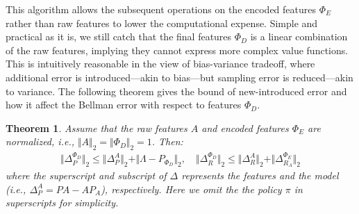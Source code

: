 \documentclass[onecolumn, conference]{IEEEtran}
\newtheorem{theorem}{\textbf{Theorem}}
\begin{document}
This algorithm allows the subsequent operations on the encoded features $\Phi_E$ rather than raw features to lower the computational expense. Simple and practical as it is, we still catch that the final features $\Phi_D$ is a linear combination of the raw features, implying they cannot express more complex value functions. This is intuitively reasonable in the view of bias-variance tradeoff, where additional error is introduced—akin to bias—but sampling error is reduced—akin to variance. The following theorem gives the bound of new-introduced error and how it affect the Bellman error with respect to features $\Phi_D$.
\begin{theorem}\label{theorem:nontabular}
	Assume that the raw features $A$ and encoded features $\Phi_E$ are normalized, \textit{i.e.,} $\Vert A\Vert_2 = \Vert \Phi_D\Vert_2 = 1$. Then:
		\begin{align*}
			\Vert \Delta_{P}^{\Phi_D}\Vert_2 \le \Vert \Delta_P^A\Vert_2 + \Vert \Lambda-P_{\Phi_D} \Vert_2,\quad \Vert\Delta_R^{\Phi_D}\Vert_2 \le \Vert \Delta_R^{A}\Vert_2 + \Vert \Delta_{R_A}^{\Phi_E} \Vert_2 
		\end{align*} 
		where the superscript and subscript of $\Delta$ represents the features and the model (\textit{i.e.,} $\Delta_P^A = PA - AP_A$), respectively. Here we omit the the policy $\pi$ in superscripts for simplicity.
\end{theorem}
\end{document}
